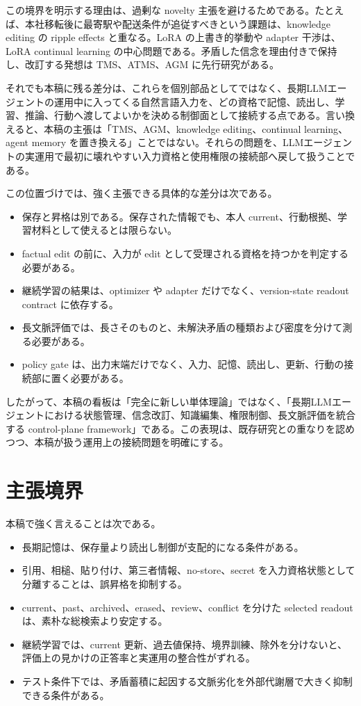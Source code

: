 \documentclass[12pt,a4paper]{article}
\begin{document}
この境界を明示する理由は、過剰な novelty 主張を避けるためである。たとえば、本社移転後に最寄駅や配送条件が追従すべきという課題は、knowledge editing の ripple effects と重なる。LoRA の上書き的挙動や adapter 干渉は、LoRA continual learning の中心問題である。矛盾した信念を理由付きで保持し、改訂する発想は TMS、ATMS、AGM に先行研究がある。

それでも本稿に残る差分は、これらを個別部品としてではなく、長期LLMエージェントの運用中に入ってくる自然言語入力を、どの資格で記憶、読出し、学習、推論、行動へ渡してよいかを決める制御面として接続する点である。言い換えると、本稿の主張は「TMS、AGM、knowledge editing、continual learning、agent memory を置き換える」ことではない。それらの問題を、LLMエージェントの実運用で最初に壊れやすい入力資格と使用権限の接続部へ戻して扱うことである。

この位置づけでは、強く主張できる具体的な差分は次である。

\begin{itemize}
\tightlist
\item
  保存と昇格は別である。保存された情報でも、本人 current、行動根拠、学習材料として使えるとは限らない。
\item
  factual edit の前に、入力が edit として受理される資格を持つかを判定する必要がある。
\item
  継続学習の結果は、optimizer や adapter だけでなく、version-state readout contract に依存する。
\item
  長文脈評価では、長さそのものと、未解決矛盾の種類および密度を分けて測る必要がある。
\item
  policy gate は、出力末端だけでなく、入力、記憶、読出し、更新、行動の接続部に置く必要がある。
\end{itemize}

したがって、本稿の看板は「完全に新しい単体理論」ではなく、「長期LLMエージェントにおける状態管理、信念改訂、知識編集、権限制御、長文脈評価を統合する control-plane framework」である。この表現は、既存研究との重なりを認めつつ、本稿が扱う運用上の接続問題を明確にする。

\section{主張境界}\label{ux4e3bux5f35ux5883ux754c}

本稿で強く言えることは次である。

\begin{itemize}
\tightlist
\item
  長期記憶は、保存量より読出し制御が支配的になる条件がある。
\item
  引用、相槌、貼り付け、第三者情報、no-store、secret を入力資格状態として分離することは、誤昇格を抑制する。
\item
  current、past、archived、erased、review、conflict を分けた selected readout は、素朴な総検索より安定する。
\item
  継続学習では、current 更新、過去値保持、境界訓練、除外を分けないと、評価上の見かけの正答率と実運用の整合性がずれる。
\item
  テスト条件下では、矛盾蓄積に起因する文脈劣化を外部代謝層で大きく抑制できる条件がある。
\end{itemize}
\end{document}
